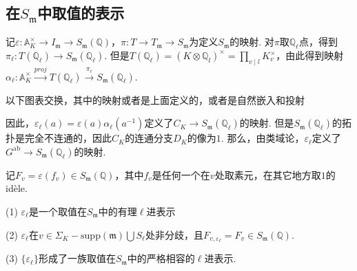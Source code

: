 \subsection{在\texorpdfstring{$S_{\mathfrak{m}}$}{Sm}中取值的表示}

记$\varepsilon : \mathbb{A}_K^{\times} \to I_{\mathfrak{m}}\to S_{\mathfrak{m}}(\mathbb{Q})$，$\pi: T \to T_{\mathfrak{m}}\to S_{\mathfrak{m}}$为定义$S_{\mathfrak{m}}$的映射. 对$\pi$取$\mathbb{Q}_{\ell}$点，得到$\pi_{\ell} : T(\mathbb{Q}_{\ell}) \to S_{\mathfrak{m}}(\mathbb{Q}_{\ell})$. 但是$T(\mathbb{Q}_{\ell}) = (K\otimes \mathbb{Q}_l)^{\times} = \prod_{v\mid l} K_v^{\times}$，由此得到映射$\alpha_{\ell} : \mathbb{A}_K^{\times} \xrightarrow{proj} T(\mathbb{Q}_{\ell}) \xrightarrow{\pi_{\ell}} S_{\mathfrak{m}}(\mathbb{Q}_{\ell})$.

\begin{clem}
    以下图表交换，其中的映射或者是上面定义的，或者是自然嵌入和投射
    \begin{figure}[H]
        \centering
    \end{figure}
\end{clem}

因此，$\varepsilon_{\ell}(a) = \varepsilon(a) \alpha_{\ell}(a^{-1})$定义了$C_K \to S_{\mathfrak{m}}(\mathbb{Q}_{\ell})$的映射. 但是$S_{\mathfrak{m}}(\mathbb{Q}_{\ell})$的拓扑是完全不连通的，因此$C_K$的连通分支$D_K$的像为$1$. 那么，由类域论，$\varepsilon_{\ell}$定义了$G^{\mathrm{ab}}\to S_{\mathfrak{m}}(\mathbb{Q}_{\ell})$的映射.

记$F_v = \varepsilon(f_v) \in S_{\mathfrak{m}}(\mathbb{Q})$，其中$f_v$是任何一个在$v$处取素元，在其它地方取$1$的idèle.

\begin{cthm}
    (1) $\varepsilon_{\ell}$是一个取值在$S_{\mathfrak{m}}$中的有理$\ell$进表示

    (2) $\varepsilon_{\ell}$在$v\in \Sigma_K - \mathrm{supp}(\mathfrak{m})\bigcup S_{\ell}$处非分歧，且$F_{v, \varepsilon_{\ell}} = F_v \in S_{\mathfrak{m}}(\mathbb{Q})$.

    (3) $\{\varepsilon_{\ell}\}$形成了一族取值在$S_{\mathfrak{m}}$中的严格相容的$\ell$进表示.
\end{cthm}

